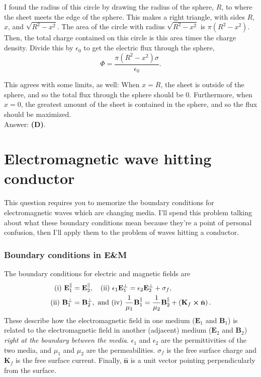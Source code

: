 \documentclass[11pt]{paper}
\newcommand{\answer}[1]{Answer: \textbf{(#1)}.}
\begin{document}
I found the radius of this circle by drawing the radius of the sphere, $R$, to where the sheet meets the edge of the sphere.  This makes a right triangle, with sides $R$, $x$, and $\sqrt{R^2-x^2}$.  The area of the circle with radius $\sqrt{R^2-x^2}$ is $\pi\left(R^2-x^2\right)$.  Then, the total charge contained on this circle is this area times the charge density.  Divide this by $\epsilon_0$ to get the electric flux through the sphere,
\begin{equation}
\Phi = \frac{\pi\left(R^2-x^2\right)\sigma}{\epsilon_0}.
\end{equation}

This agrees with some limits, as well: When $x=R$, the sheet is outside of the sphere, and so the total flux through the sphere should be 0.  Furthermore, when $x=0$, the greatest amount of the sheet is contained in the sphere, and so the flux should be maximized.\\

\answer{D}

\section{Electromagnetic wave hitting conductor}
This question requires you to memorize the boundary conditions for electromagnetic waves which are changing media.  I'll spend this problem talking about what these boundary conditions mean because they're a point of personal confusion, then I'll apply them to the problem of waves hitting a conductor.
\subsubsection*{Boundary conditions in E\&M}
The boundary conditions for electric and magnetic fields are
\begin{align}
\text{(i) } \mathbf{E}_{1}^{\parallel} &= \mathbf{E}_{2}^{\parallel}, \quad \text{(ii) }\epsilon_1\mathbf{E}_{1}^{\perp} = \epsilon_2\mathbf{E}_{2}^{\perp} + \sigma_f,\\
\text{(ii) }\mathbf{B}_{1}^{\perp}&=\mathbf{B}_{2}^{\perp}, \text{ and } \text{(iv) } \frac{1}{\mu_1}\mathbf{B}_{1}^{\parallel} = \frac{1}{\mu_2}\mathbf{B}_{2}^{\parallel} + \left(\mathbf{K}_f \cross \hat{\mathbf{n}}\right).
\end{align}
These describe how the electromagnetic field in one medium ($\mathbf{E}_1$ and $\mathbf{B}_1$) is related to the electromagnetic field in another (adjacent) medium ($\mathbf{E}_2$ and $\mathbf{B}_2$) \emph{right at the boundary between the media}.  $\epsilon_1$ and $\epsilon_2$ are the permittivities of the two media, and $\mu_1$ and $\mu_2$ are the permeabilities.  $\sigma_f$ is the free surface charge and $\mathbf{K}_f$ is the free surface current.  Finally, $\hat{\mathbf{n}}$ is a unit vector pointing perpendicularly from the surface.
\end{document}

